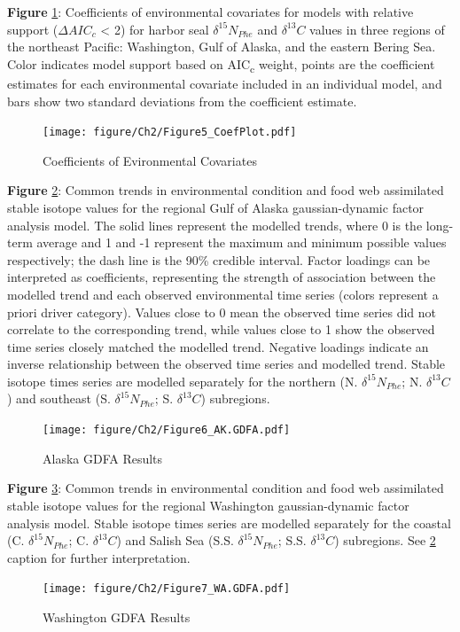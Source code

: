 \documentclass [11pt, proquest] {uwthesis}[2015/03/03]
\begin{document}
\textbf{Figure} \ref{fig:coefres}: Coefficients of environmental covariates for models with relative support (\(\Delta AIC_c\) \textless{} 2) for harbor seal \(\delta^{15}N_{Phe}\) and \(\delta^{13}C\) values in three regions of the northeast Pacific: Washington, Gulf of Alaska, and the eastern Bering Sea. Color indicates model support based on AIC\textsubscript{c} weight, points are the coefficient estimates for each environmental covariate included in an individual model, and bars show two standard deviations from the coefficient estimate.
\newline 
\begin{figure}[h]
\centering
  \texttt{[image: figure/Ch2/Figure5\_CoefPlot.pdf]}
  \caption{Coefficients of Evironmental Covariates}
  \label{fig:coefres}
\end{figure}
\clearpage

\textbf{Figure} \ref{fig:GDFAAK}: Common trends in environmental condition and food web assimilated stable isotope values for the regional Gulf of Alaska gaussian-dynamic factor analysis model. The solid lines represent the modelled trends, where 0 is the long-term average and 1 and -1 represent the maximum and minimum possible values respectively; the dash line is the 90\% credible interval. Factor loadings can be interpreted as coefficients, representing the strength of association between the modelled trend and each observed environmental time series (colors represent a priori driver category). Values close to 0 mean the observed time series did not correlate to the corresponding trend, while values close to 1 show the observed time series closely matched the modelled trend. Negative loadings indicate an inverse relationship between the observed time series and modelled trend. Stable isotope times series are modelled separately for the northern (N. \(\delta^{15}N_{Phe}\); N. \(\delta^{13}C\)) and southeast (S. \(\delta^{15}N_{Phe}\); S. \(\delta^{13}C\)) subregions.\\
\newline 
\begin{figure}[h]
\centering
  \texttt{[image: figure/Ch2/Figure6\_AK.GDFA.pdf]}
  \caption{Alaska GDFA Results}
  \label{fig:GDFAAK}
\end{figure}
\clearpage

\textbf{Figure} \ref{fig:GDFAWA}: Common trends in environmental condition and food web assimilated stable isotope values for the regional Washington gaussian-dynamic factor analysis model. Stable isotope times series are modelled separately for the coastal (C. \(\delta^{15}N_{Phe}\); C. \(\delta^{13}C\)) and Salish Sea (S.S. \(\delta^{15}N_{Phe}\); S.S. \(\delta^{13}C\)) subregions. See \ref{fig:GDFAAK} caption for further interpretation.\\
\newline 
\begin{figure}[h]
\centering
  \texttt{[image: figure/Ch2/Figure7\_WA.GDFA.pdf]}
  \caption{Washington GDFA Results}
  \label{fig:GDFAWA}
\end{figure}
\clearpage
\end{document}
